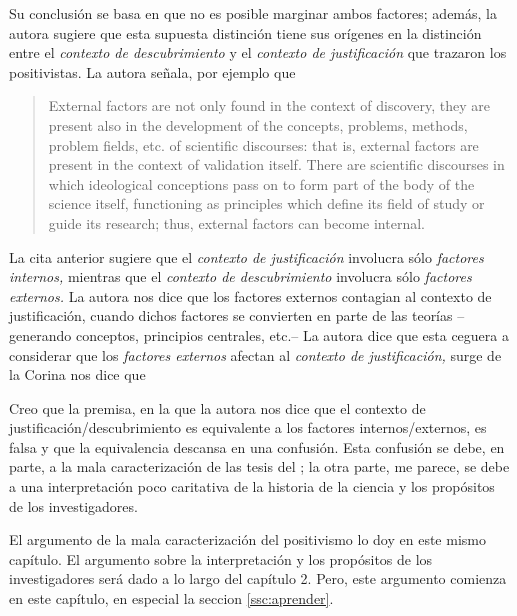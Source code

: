 Su conclusión se basa en que no es posible marginar ambos factores; además, la autora sugiere que esta supuesta distinción tiene sus orígenes en la distinción entre el \emph{contexto de descubrimiento} y el \emph{contexto de justificación} que trazaron los positivistas.
La autora señala, por ejemplo que

\begin{quote}
	External factors are not only found in the context of discovery, they are present also in the development of the concepts, problems, methods, problem fields, etc. of scientific discourses: that is, external factors are present in the context of validation itself.
	There are scientific discourses in which ideological conceptions pass on to form part of the body of the science itself, functioning as principles which define its field of study or guide its research; thus, external factors can become internal. \parencite[p. 85]{Yturbe1995}
\end{quote}

La cita anterior sugiere que el \emph{contexto de justificación} involucra sólo \emph{factores internos,} mientras que el \emph{contexto de descubrimiento} involucra sólo \emph{factores externos.}
La autora nos dice que los factores externos contagian al contexto de justificación, cuando dichos factores se convierten en parte de las teorías --generando conceptos, principios centrales, etc.--
La autora dice que esta ceguera a considerar que los \emph{factores externos} afectan al \emph{contexto de justificación,} surge de la 
Corina nos dice que  \parencite[p. 75]{Yturbe1995}

Creo que la premisa, en la que la autora nos dice que el contexto de justificación/descubrimiento es equivalente a los factores internos/externos, es falsa y que la equivalencia descansa en una confusión.
Esta confusión se debe, en parte, a la mala caracterización de las tesis del ; la otra parte, me parece, se debe a una interpretación poco caritativa de la historia de la ciencia y los propósitos de los investigadores.

El argumento de la mala caracterización del positivismo lo doy en este mismo capítulo.
El argumento sobre la interpretación y los propósitos de los investigadores será dado a lo largo del capítulo 2.
Pero, este argumento comienza en este capítulo, en especial la seccion \ref{ssc:aprender}.

